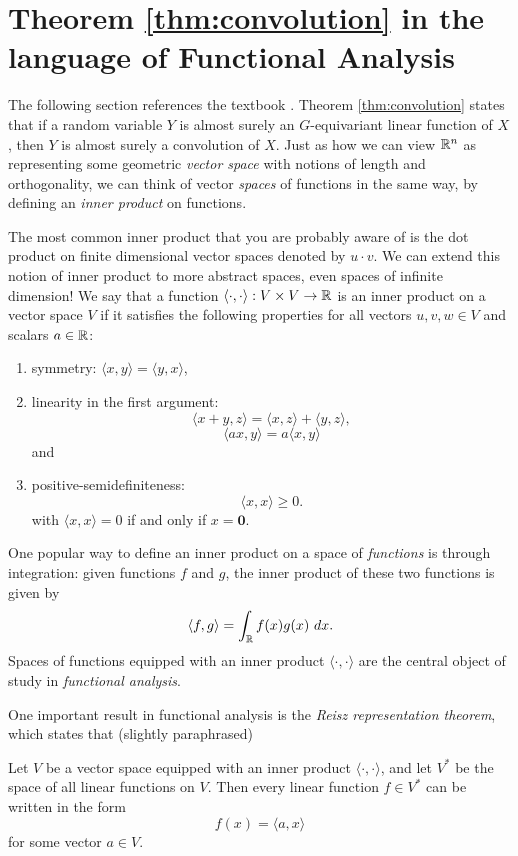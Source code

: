 \section{Theorem \ref{thm:convolution} in the language of Functional Analysis}
The following section references the textbook \cite{BuhlerTheo2018Fa/T}.
Theorem \ref{thm:convolution} states that if a random variable $Y$ is almost surely an $G$-equivariant linear function of $X$, then $Y$ is almost surely a convolution of $X$.
Just as how we can view $\mathbb{R}^n$ as representing some geometric \textit{vector space} with notions of length and orthogonality, we can think of vector \textit{spaces} of functions in the same way, by defining an \textit{inner product} on functions.

The most common inner product that you are probably aware of is the dot product on finite dimensional vector spaces denoted by $u \cdot v$.
We can extend this notion of inner product to more abstract spaces, even spaces of infinite dimension!
We say that a function $\langle \cdot, \cdot \rangle : V \times V \to \mathbb{R}$ is an inner product on a vector space $V$ if it satisfies the following properties for all vectors $u,v,w \in V$ and scalars $a \in \mathbb{R}$:
\begin{enumerate}[label=(\alph*)]
	\item symmetry: $\langle x, y \rangle = \langle y, x \rangle$,
	\item linearity in the first argument:
	$$
		\langle x + y, z \rangle = \langle x, z \rangle + \langle y,z \rangle,
	$$
	$$
		\langle ax, y \rangle = a \langle x,y \rangle
	$$
	and
	\item 
	positive-semidefiniteness:
	$$
		\langle x, x \rangle \geq 0.
	$$
	with $\langle x, x \rangle = 0$ if and only if $x = \textbf{0}$.
\end{enumerate}
One popular way to define an inner product on a space of \textit{functions} is through integration: given functions $f$ and $g$, the inner product of these two functions is given by
$$
	\langle f,g \rangle = \int_{\bbR} f(x) g(x)\ dx.
$$
Spaces of functions equipped with an inner product $\langle \cdot, \cdot \rangle$ are the central object of study in \textit{functional analysis}.

One important result in functional analysis is the \textit{Reisz representation theorem}, which states that (slightly paraphrased)
\begin{theorem}
Let $V$ be a vector space equipped with an inner product $\langle \cdot, \cdot \rangle$, and let $V^*$ be the space of all linear functions on $V$.
Then every linear function $f \in V^*$ can be written in the form
$$
	f(x) = \langle a, x \rangle
$$ 
for some vector $a \in V$.
\end{theorem}

